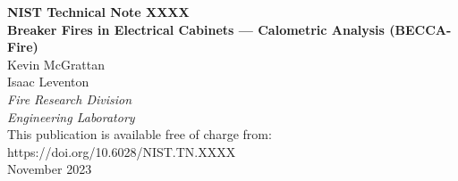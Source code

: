 \documentclass[12pt]{article}
\newcommand{\pubnumber}{XXXX}
\newcommand{\DOI}{https://doi.org/10.6028/NIST.TN.XXXX}
\newcommand{\monthyear}{November 2023}
\begin{document}
\begin{titlepage}
\begin{flushright}
\LARGE{\textbf{NIST Technical Note \pubnumber}}\\
\vfill
\Huge{\textbf{Breaker Fires in Electrical Cabinets --- Calometric Analysis (BECCA-Fire)}}\\
\vfill
\normalsize Kevin McGrattan \\ Isaac Leventon \\
\textit{Fire Research Division}\\
\textit{Engineering Laboratory}\\
\vfill
\normalsize This publication is available free of charge from:\\
\DOI\\
\vfill
\normalsize \monthyear
\vfill


\end{flushright}
\end{titlepage}
\end{document}
